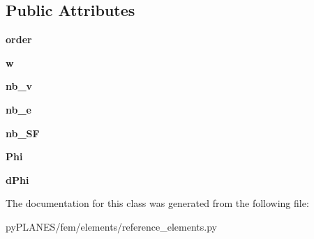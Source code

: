 \subsection*{Public Attributes}
\begin{DoxyCompactItemize}
\item 
\mbox{\label{classpy_p_l_a_n_e_s_1_1fem_1_1elements_1_1reference__elements_1_1_ka_a1973a0da18e59cc0974a98b45d03610e}} 
{\bfseries order}
\item 
\mbox{\label{classpy_p_l_a_n_e_s_1_1fem_1_1elements_1_1reference__elements_1_1_ka_aabf940be4336c645e5ee343f8ca809a0}} 
{\bfseries w}
\item 
\mbox{\label{classpy_p_l_a_n_e_s_1_1fem_1_1elements_1_1reference__elements_1_1_ka_a9651efc5ee9e429a64ba2a6b95a6b3ec}} 
{\bfseries nb\+\_\+v}
\item 
\mbox{\label{classpy_p_l_a_n_e_s_1_1fem_1_1elements_1_1reference__elements_1_1_ka_a3b3d6f98f73ce2062c5de8bdd89785b8}} 
{\bfseries nb\+\_\+e}
\item 
\mbox{\label{classpy_p_l_a_n_e_s_1_1fem_1_1elements_1_1reference__elements_1_1_ka_aaf1e1adc6f9e29d8e97889962314f5f8}} 
{\bfseries nb\+\_\+\+SF}
\item 
\mbox{\label{classpy_p_l_a_n_e_s_1_1fem_1_1elements_1_1reference__elements_1_1_ka_a22796a4eab40a49097878eafd76a7281}} 
{\bfseries Phi}
\item 
\mbox{\label{classpy_p_l_a_n_e_s_1_1fem_1_1elements_1_1reference__elements_1_1_ka_af114ddb55705f43e8daa37bc62580add}} 
{\bfseries d\+Phi}
\end{DoxyCompactItemize}


The documentation for this class was generated from the following file\+:\begin{DoxyCompactItemize}
\item 
py\+P\+L\+A\+N\+E\+S/fem/elements/reference\+\_\+elements.\+py\end{DoxyCompactItemize}
